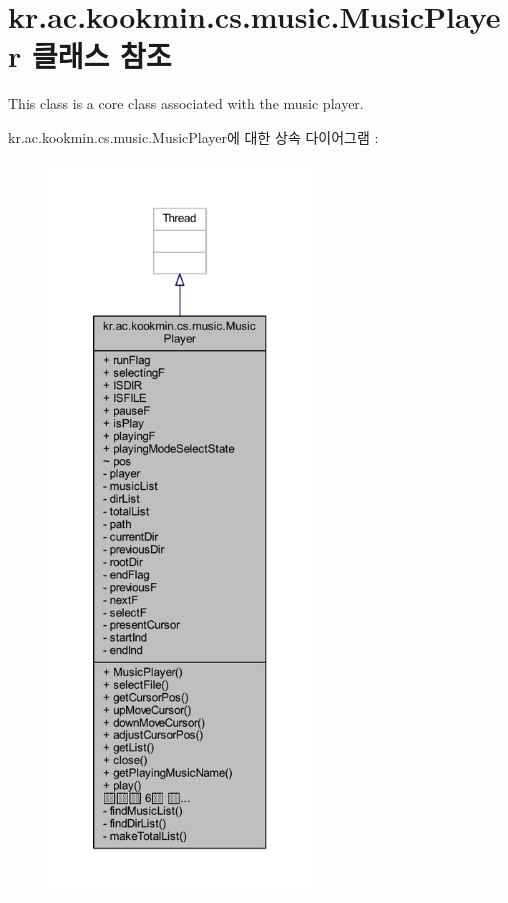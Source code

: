 \hypertarget{classkr_1_1ac_1_1kookmin_1_1cs_1_1music_1_1_music_player}{}\section{kr.\+ac.\+kookmin.\+cs.\+music.\+Music\+Player 클래스 참조}
\label{classkr_1_1ac_1_1kookmin_1_1cs_1_1music_1_1_music_player}


This class is a core class associated with the music player.  




kr.\+ac.\+kookmin.\+cs.\+music.\+Music\+Player에 대한 상속 다이어그램 \+: \nopagebreak
\begin{figure}[H]
\begin{center}
\leavevmode
\includegraphics[height=550pt]{classkr_1_1ac_1_1kookmin_1_1cs_1_1music_1_1_music_player__inherit__graph}
\end{center}
\end{figure}


